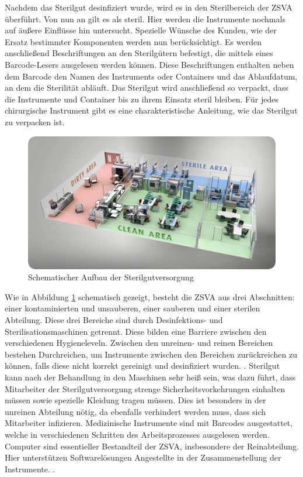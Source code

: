 Nachdem das Sterilgut desinfiziert wurde, wird es in den Sterilbereich der ZSVA überführt. Von nun an gilt es als steril. Hier werden die Instrumente nochmals auf äußere Einflüsse hin untersucht. Spezielle Wünsche des Kunden, wie der Ersatz bestimmter Komponenten werden nun berücksichtigt. Es werden anschließend Beschriftungen an den Sterilgütern befestigt, die mittels eines Barcode-Lesers ausgelesen werden können. Diese Beschriftungen enthalten neben dem Barcode den Namen des Instruments oder Containers und das Ablaufdatum, an dem die Sterilität abläuft. Das Sterilgut wird anschließend so verpackt, dass die Instrumente und Container bis zu ihrem Einsatz steril bleiben. Für jedes chirurgische Instrument gibt es eine charakteristische Anleitung, wie das Sterilgut zu verpacken ist.

\begin{figure}[htbp]
    \centering
    \includegraphics[width=1\textwidth]{data/bilder/clean-area-sterile-area.png}
    \caption{Schematischer Aufbau der Sterilgutversorgung \cite{Ives2017}}
    \label{fig:AufbauDerSterilgutversorgung}
\end{figure}

Wie in Abbildung \ref{fig:AufbauDerSterilgutversorgung} schematisch gezeigt, besteht die ZSVA aus drei Abschnitten: einer kontaminierten und unsauberen, einer sauberen und einer sterilen Abteilung. Diese drei Bereiche sind durch Desinfektions- und Sterilisationsmaschinen getrennt. Diese bilden eine Barriere zwischen den verschiedenen Hygieneleveln. Zwischen den unreinen- und reinen Bereichen bestehen Durchreichen, um Instrumente zwischen den Bereichen zurückreichen zu können, falls diese nicht korrekt gereinigt und desinfiziert wurden. \cite[S.~24]{Ruther2014}. Sterilgut kann nach der Behandlung in den Maschinen sehr heiß sein, was dazu führt, dass Mitarbeiter der Sterilgutversorgung strenge Sicherheitsvorkehrungen einhalten müssen sowie spezielle Kleidung tragen müssen. Dies ist besonders in der unreinen Abteilung nötig, da ebenfalls verhindert werden muss, dass sich Mitarbeiter infizieren. Medizinische Instrumente sind mit Barcodes ausgestattet, welche in verschiedenen Schritten des Arbeitsprozesses ausgelesen werden. Computer sind essentieller Bestandteil der ZSVA, insbesondere der Reinabteilung. Hier unterstützen Softwarelösungen Angestellte in der Zusammenstellung der Instrumente. \cite[S.~25]{Ruther2014}.
%
%
%
%
%
%
